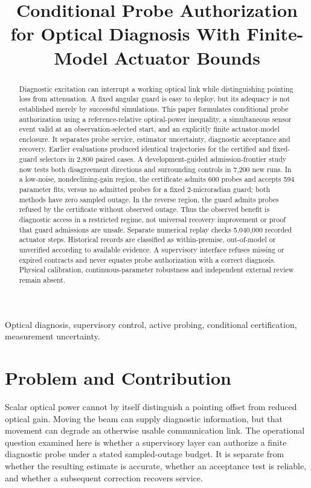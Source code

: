 \documentclass[10pt,journal]{IEEEtran}
\begin{document}
\title{Conditional Probe Authorization for Optical Diagnosis With Finite-Model Actuator Bounds}
\author{}
\maketitle
\begin{abstract}
Diagnostic excitation can interrupt a working optical link while distinguishing pointing loss from attenuation. A fixed angular guard is easy to deploy, but its adequacy is not established merely by successful simulations. This paper formulates conditional probe authorization using a reference-relative optical-power inequality, a simultaneous sensor event valid at an observation-selected start, and an explicitly finite actuator-model enclosure. It separates probe service, estimator uncertainty, diagnostic acceptance and recovery. Earlier evaluations produced identical trajectories for the certified and fixed-guard selectors in 2,800 paired cases. A development-guided admission-frontier study now tests both disagreement directions and surrounding controls in 7,200 new runs. In a low-noise, nondeclining-gain region, the certificate admits 600 probes and accepts 594 parameter fits, versus no admitted probes for a fixed 2-microradian guard; both methods have zero sampled outage. In the reverse region, the guard admits probes refused by the certificate without observed outage. Thus the observed benefit is diagnostic access in a restricted regime, not universal recovery improvement or proof that guard admissions are unsafe. Separate numerical replay checks 5,040,000 recorded actuator steps. Historical records are classified as within-premise, out-of-model or unverified according to available evidence. A supervisory interface refuses missing or expired contracts and never equates probe authorization with a correct diagnosis. Physical calibration, continuous-parameter robustness and independent external review remain absent.
\end{abstract}
\begin{IEEEkeywords}Optical diagnosis, supervisory control, active probing, conditional certification, measurement uncertainty.\end{IEEEkeywords}

\section{Problem and Contribution}
Scalar optical power cannot by itself distinguish a pointing offset from reduced optical gain. Moving the beam can supply diagnostic information, but that movement can degrade an otherwise usable communication link. The operational question examined here is whether a supervisory layer can authorize a finite diagnostic probe under a stated sampled-outage budget. It is separate from whether the resulting estimate is accurate, whether an acceptance test is reliable, and whether a subsequent correction recovers service.
\end{document}
